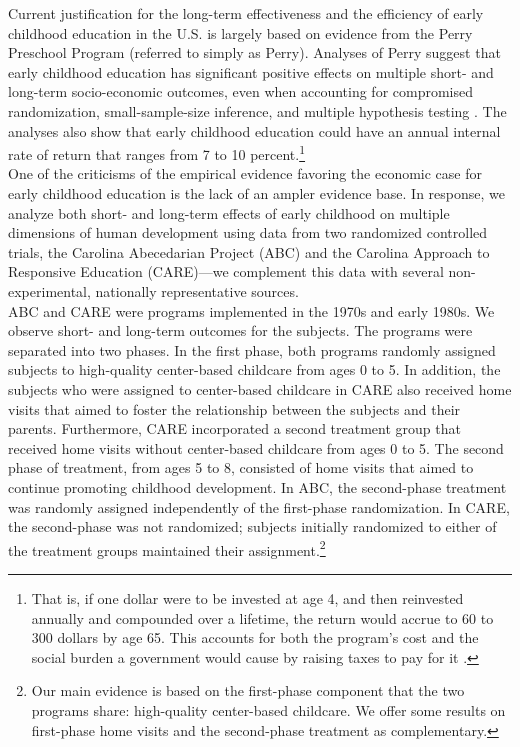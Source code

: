 \noindent  Current justification for the long-term effectiveness and the efficiency of early childhood education in the U.S. is largely based on evidence from the Perry Preschool Program (referred to simply as Perry). Analyses of Perry suggest that early childhood education has significant positive effects on multiple short- and long-term socio-economic outcomes, even when accounting for compromised randomization, small-sample-size inference, and multiple hypothesis testing \citep{Heckman_Moon_etal_2010_QE}. The analyses also show that early childhood education could have an annual internal rate of return that ranges from 7 to 10 percent.\footnote{That is, if one dollar were to be invested at age 4, and then reinvested annually and compounded over a lifetime, the return would accrue to 60 to 300 dollars by age 65. This accounts for both the program's cost and the social burden a government would cause by raising taxes to pay for it \citep{Heckman_Moon_etal_2010_RateofReturn}.}\\

\noindent One of the criticisms of the empirical evidence favoring the economic case for early childhood education is the lack of an ampler evidence base. In response, we analyze both short- and long-term effects of early childhood on multiple dimensions of human development using data from two randomized controlled trials, the Carolina Abecedarian Project (ABC) and the Carolina Approach to Responsive Education (CARE)---we complement this data with several non-experimental, nationally representative sources.\\

\noindent ABC and CARE were programs implemented in the 1970s and early 1980s. We observe short- and long-term outcomes for the subjects. The programs were separated into two phases. In the first phase, both programs randomly assigned subjects to high-quality center-based childcare from ages 0 to 5. In addition, the subjects who were assigned to center-based childcare in CARE also received home visits that aimed to foster the relationship between the subjects and their parents. Furthermore, CARE incorporated a second treatment group that received home visits without center-based childcare from ages 0 to 5. The second phase of treatment, from ages 5 to 8, consisted of home visits that aimed to continue promoting childhood development. In ABC, the second-phase treatment was randomly assigned independently of the first-phase randomization. In CARE, the second-phase was not randomized; subjects initially randomized to either of the treatment groups maintained their assignment.\footnote{Our main evidence is based on the first-phase component that the two programs share: high-quality center-based childcare. We offer some results on first-phase home visits and the second-phase treatment as complementary.}\\

